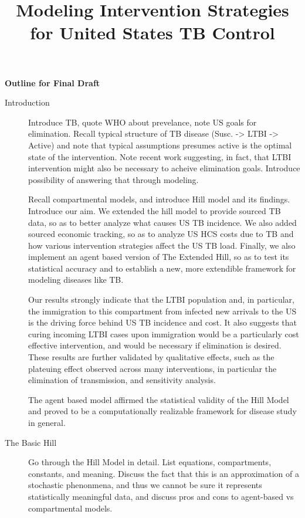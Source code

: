 \documentclass{amsart}
\title{Modeling Intervention Strategies for United States TB Control}
\begin{document}
\maketitle

\textbf{Outline for Final Draft}

\begin{description}
  \item[Introduction] Introduce TB, quote WHO about prevelance, note US goals
    for elimination. Recall typical structure of TB disease (Susc. -> LTBI ->
    Active) and note that typical assumptions presumes active is the optimal
    state of the intervention. Note recent work suggesting, in fact, that LTBI
    intervention might also be necessary to acheive elimination goals. Introduce
    possibility of answering that through modeling. 

    Recall compartmental models, and introduce Hill model and its findings.
    Introduce our aim. We extended the hill model to provide sourced TB data, so
    as to better analyze what causes US TB incidence. We also added sourced
    economic tracking, so as to analyze US HCS costs due to TB and how various
    intervention strategies affect the US TB load. Finally, we also implement an
    agent based version of The Extended Hill, so as to test its statistical
    accuracy and to establish a new, more extendible framework for modeling
    diseases like TB. 

    Our results strongly indicate that the LTBI population and, in particular,
    the immigration to this compartment from infected new arrivals to the US is
    the driving force behind US TB incidence and cost. It also suggests that
    curing incoming LTBI cases upon immigration would be a particularly cost
    effective intervention, and would be necessary if elimination is desired.
    These results are further validated by qualitative effects, such as the
    plateuing effect observed across many interventions, in particular the
    elimination of transmission, and sensitivity analysis. 

    The agent based model affirmed the statistical validity of the Hill Model
    and proved to be a computationally realizable framework for disease study in
    general. 
  \item[The Basic Hill]
    Go through the Hill Model in detail. List equations, compartments,
    constants, and meaning. Discuss the fact that this is an approximation of a
    stochastic phenonmena, and thus we cannot be sure it represents
    statistically meaningful data, and discuss pros and cons to agent-based vs
    compartmental models. 
    

\end{description}
\end{document}
